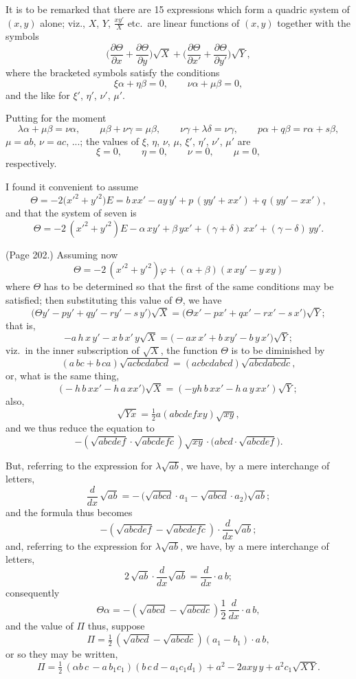 \documentclass[11pt,a4paper]{article}
\theoremstyle{plain}
\theoremstyle{definition}
\newcommand{\Th}{\Theta} %
\begin{document}
It is to be remarked that there are 15 expressions which form a quadric system of $(x, y)$ alone; viz., $X$, $Y$, $\frac{x y'}{X}$ etc.\ are linear functions of $(x, y)$ together with the symbols
\[
\Big(\frac{\partial\Th}{\partial x} + \frac{\partial\Th}{\partial y}\Big) \sqrt{X} + \Big(\frac{\partial\Th}{\partial x'} + \frac{\partial\Th}{\partial y'}\Big) \sqrt{Y},
\]
where the bracketed symbols satisfy the conditions
\[
\xi \alpha + \eta \beta = 0, \qquad \nu \alpha + \mu \beta = 0,
\]
and the like for $\xi'$, $\eta'$, $\nu'$, $\mu'$.

Putting for the moment
\[
\lambda \alpha + \mu \beta = \nu \alpha, \qquad \mu \beta + \nu \gamma = \mu \beta, \qquad \nu \gamma + \lambda \delta = \nu \gamma, \qquad p \alpha + q \beta = r \alpha + s \beta,
\]
$\mu = ab$, $\nu = ac$, ...; the values of $\xi$, $\eta$, $\nu$, $\mu$, $\xi'$, $\eta'$, $\nu'$, $\mu'$ are
\[
\xi = 0, \qquad \eta = 0, \qquad \nu = 0, \qquad \mu = 0,
\]
respectively.

I found it convenient to assume
\[
\Th = -2 \big(x'^2 + y'^2 \big)E = b\,xx' - ay\,y' + p\,(yy' + xx') + q\,(yy' - xx'),
\]
and that the system of seven is
\[
\Th = -2\,(x'^2 + y'^2)E - \alpha\,xy' + \beta\,yx' + (\gamma + \delta)\,xx' + (\gamma - \delta)\,yy'.
\]

\medskip

\noindent (Page 202.) Assuming now
\[
\Th = -2\,(x'^2 + y'^2) \varphi + (\alpha + \beta) (x\,xy' - y\,xy)
\]
where $\Th$ has to be determined so that the first of the same conditions may be satisfied; then substituting this value of $\Th$, we have
\[
\Big(\Th y' - p y' + q y' - r y' - s\, y'\Big) \sqrt{X} = \Big(\Th x' - p x' + q x' - r x' - s\, x'\Big) \sqrt{Y};
\]
that is,
\[
- a\, h\, x\,y' - x\,b\,x'\,y\sqrt{X} = \Big( - a x\, x' + b\,x y' - b\,y\,x'\Big)\sqrt{Y};
\]
viz.\ in the inner subscription of $\sqrt{X}$, the function $\Theta$ is to be diminished by
\[
(a\,bc + b\,ca) \sqrt{a c b c d a b c d} = (a c b c d a b c d) \sqrt{a b c d a b c d c},
\]
or, what is the same thing,
\[
\Big( - h\, b\,x x' - h\,a\,x x'\Big) \sqrt{X} = (-y h\,b\,x x' - h\,a\,y\,x x') \sqrt{Y};
\]
also,
\[
\sqrt{Y x} = \tfrac{1}{2} a (a b c d e f x y) \sqrt{x y},
\]
and we thus reduce the equation to
\[
- ( \sqrt{a b c d e f} \cdot \sqrt{a b c d e f c}) \sqrt{x y} \cdot \big( a b c d \cdot \sqrt{a b c d e f}\big).
\]

But, referring to the expression for $\lambda \sqrt{a b}$, we have, by a mere interchange of letters,
\[
\frac{d}{d x}\, \sqrt{a b} = -\, \big(\sqrt{a b c d} \cdot a_1 - \sqrt{a b c d} \cdot a_2\big) \sqrt{a b};
\]
and the formula thus becomes
\[
- ( \sqrt{a b c d e f} - \sqrt{a b c d e f c}) \cdot \frac{d}{d x} \sqrt{a b};
\]
and, referring to the expression for $\lambda \sqrt{a b}$, we have, by a mere interchange of letters,
\[
2\, \sqrt{a b} \cdot \frac{d}{d x} \sqrt{a b} = \frac{d}{d x} \cdot a\,b;
\]
consequently
\[
\Theta \alpha = - ( \sqrt{a b c d} - \sqrt{a b c d c}) \frac{1}{2}\,\frac{d}{d x} \cdot a\,b,
\]
and the value of $\Pi$ thus, suppose
\[
\Pi = \tfrac{1}{2}\,(\sqrt{a b c d} - \sqrt{a b c d c})(a_1 - b_1) \cdot a\,b,
\]
or so they may be written,
\[
\Pi = \tfrac{1}{2}\,(\alpha b\,c\, - a\,b_1 c_1) (b\,c\,d - a_1 c_1 d_1) + a^2 - 2 a x y\,y + a^2 c_1\sqrt{X\,Y}.
\]
\end{document}
